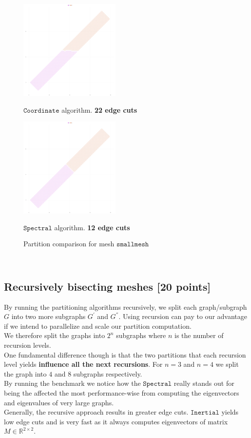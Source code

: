 \documentclass[unicode,11pt,a4paper,oneside,numbers=endperiod,openany]{scrartcl}
\begin{document}
\begin{figure}[h!]
    \begin{minipage}{0.5\textwidth}
        \centering
        \includegraphics[height=5cm]{fig/plot/bisection/bisection-smallmesh-coordinate-cut_22.0}
        \caption{$\texttt {Coordinate}$ algorithm. \textbf{22 edge cuts}}
    \end{minipage}
        \begin{minipage}{0.5\textwidth}
        \centering
        \includegraphics[height=5cm]{fig/plot/bisection/bisection-smallmesh-spectral-cut_12.0}
        \caption{$\texttt {Spectral}$ algorithm. \textbf{12 edge cuts}}
    \end{minipage}
    \caption*{Partition comparison for mesh $\texttt {smallmesh}$}
\end{figure}\\

\clearpage
\subsection{Recursively bisecting meshes [20 points]}
By running the partitioning algorithms recursively, we split each graph/subgraph $G$ into two more subgraphs $G^'$ and $G^{''}$. Using recursion can pay to our advantage if we intend to parallelize and scale our partition computation. \\
We therefore split the graphs into $2^n$ subgraphs where $n$ is the number of recursion levels.\\
One fundamental difference though is that the two partitions that each recursion level yields \textbf{influence all the next recursions}. For $n=3$ and $n=4$ we split the graph into $4$ and $8$ subgraphs respectively.\\
By running the benchmark we notice how the $\texttt {Spectral}$ really stands out for being the affected the most performance-wise from computing the eigenvectors and eigenvalues of very large graphs.\\ Generally, the recursive approach results in greater edge cuts. $\texttt {Inertial}$ yields low edge cuts and is very fast as it always computes eigenvectors of matrix $M\in \mathbb{R}^{2\times 2}$. 
\end{document}
